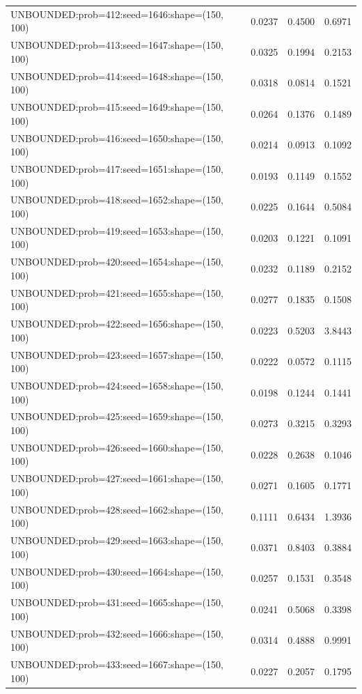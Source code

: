 \begin{longtable}{lccc}
UNBOUNDED:prob=412:seed=1646:shape=(150, 100) &   0.0237 &  0.4500 &  0.6971 \\
UNBOUNDED:prob=413:seed=1647:shape=(150, 100) &   0.0325 &  0.1994 &  0.2153 \\
UNBOUNDED:prob=414:seed=1648:shape=(150, 100) &   0.0318 &  0.0814 &  0.1521 \\
UNBOUNDED:prob=415:seed=1649:shape=(150, 100) &   0.0264 &  0.1376 &  0.1489 \\
UNBOUNDED:prob=416:seed=1650:shape=(150, 100) &   0.0214 &  0.0913 &  0.1092 \\
UNBOUNDED:prob=417:seed=1651:shape=(150, 100) &   0.0193 &  0.1149 &  0.1552 \\
UNBOUNDED:prob=418:seed=1652:shape=(150, 100) &   0.0225 &  0.1644 &  0.5084 \\
UNBOUNDED:prob=419:seed=1653:shape=(150, 100) &   0.0203 &  0.1221 &  0.1091 \\
UNBOUNDED:prob=420:seed=1654:shape=(150, 100) &   0.0232 &  0.1189 &  0.2152 \\
UNBOUNDED:prob=421:seed=1655:shape=(150, 100) &   0.0277 &  0.1835 &  0.1508 \\
UNBOUNDED:prob=422:seed=1656:shape=(150, 100) &   0.0223 &  0.5203 &  3.8443 \\
UNBOUNDED:prob=423:seed=1657:shape=(150, 100) &   0.0222 &  0.0572 &  0.1115 \\
UNBOUNDED:prob=424:seed=1658:shape=(150, 100) &   0.0198 &  0.1244 &  0.1441 \\
UNBOUNDED:prob=425:seed=1659:shape=(150, 100) &   0.0273 &  0.3215 &  0.3293 \\
UNBOUNDED:prob=426:seed=1660:shape=(150, 100) &   0.0228 &  0.2638 &  0.1046 \\
UNBOUNDED:prob=427:seed=1661:shape=(150, 100) &   0.0271 &  0.1605 &  0.1771 \\
UNBOUNDED:prob=428:seed=1662:shape=(150, 100) &   0.1111 &  0.6434 &  1.3936 \\
UNBOUNDED:prob=429:seed=1663:shape=(150, 100) &   0.0371 &  0.8403 &  0.3884 \\
UNBOUNDED:prob=430:seed=1664:shape=(150, 100) &   0.0257 &  0.1531 &  0.3548 \\
UNBOUNDED:prob=431:seed=1665:shape=(150, 100) &   0.0241 &  0.5068 &  0.3398 \\
UNBOUNDED:prob=432:seed=1666:shape=(150, 100) &   0.0314 &  0.4888 &  0.9991 \\
UNBOUNDED:prob=433:seed=1667:shape=(150, 100) &   0.0227 &  0.2057 &  0.1795 \\

\end{longtable}
